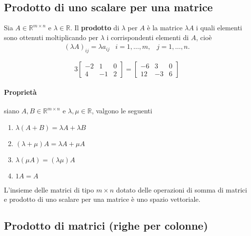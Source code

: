 \subsection{Prodotto di uno scalare per una matrice}
\label{sec:prodmatrice}

Sia $A\in \mathds{R}^{m\times n}$ e $\lambda \in \mathds{R}$. Il
\textbf{prodotto} di $\lambda$ per $A$ è la matrice $\lambda A$ i quali
elementi sono ottenuti moltiplicando per $\lambda$ i corrispondenti
elementi di $A$, cioè
\begin{eqnarray*}
  (\lambda A)_{ij}=\lambda a_{ij} & i = 1,\dots,m, & j=1,\dots,n.
\end{eqnarray*}
\begin{es}
  \label{es:prodmatrice1}
  \begin{equation*}
    3
    \begin{bmatrix}
      -2 & 1 & 0\\
      4 & -1 & 2
    \end{bmatrix} =
    \begin{bmatrix}
      -6 & 3 & 0\\
      12 & -3 & 6
    \end{bmatrix}
  \end{equation*}
  
\end{es}

\paragraph{Proprietà}

siano $A,B\in \mathds{R}^{m\times n}$ e $\lambda, \mu \in \mathds{R}$, valgono le
seguenti
\begin{enumerate}
\item $\lambda (A+B)=\lambda A+\lambda B$
\item $(\lambda + \mu)A=\lambda A+\mu A$
\item $\lambda (\mu A)=(\lambda\mu) A$
\item $1A=A$
\end{enumerate}
\begin{oss}
  \label{oss:prodmatrice1}
  L'insieme delle matrici di tipo $m\times n$ dotato delle operazioni di
  somma di matrici e prodotto di uno scalare per una matrice è uno
  spazio vettoriale.
\end{oss}

\subsection{Prodotto di matrici (righe per colonne)}
\label{sec:prodmtxrigcol}


